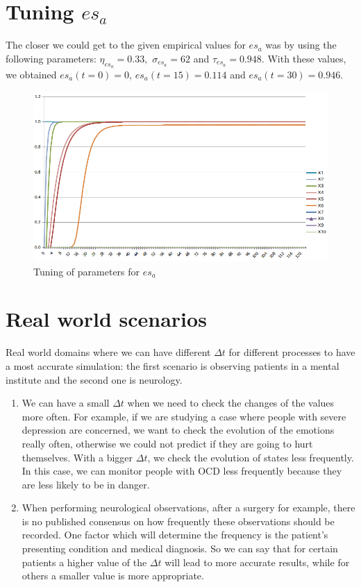 \documentclass[a4paper]{article}
\begin{document}
\section{Tuning $es_{a}$}

The closer we could get to the given empirical values for $es_{a}$ was by using the following parameters: $\eta_{es_{a}} = 0.33,$ $\sigma_{es_{a}} = 62$ and $\tau_{es_{a}} = 0.948$. With these values, we obtained $es_{a}(t = 0) = 0$, $es_{a}(t = 15) = 0.114$ and $es_{a}(t = 30) = 0.946$.

\begin{figure}[!htpb]
\center
\includegraphics[width=\textwidth]{res/img/tuning}
\caption{Tuning of parameters for $es_{a}$}
\label{fig:tuning}
\end{figure}

\section{Real world scenarios}

Real world domains where we can have different $\Delta t$ for different processes to have a most accurate simulation: the first scenario is observing patients in a mental institute and the second one is neurology.

\begin{enumerate}
\item We can have a small $\Delta t$ when we need to check the changes of the values more often. For example, if we are studying a case where people with severe depression are concerned, we want to check the evolution of the emotions really often, otherwise we could not predict if they are going to hurt themselves. With a bigger $\Delta t$, we check the evolution of states less frequently. In this case, we can monitor people with OCD less frequently because they are less likely to be in danger.
\item When performing neurological observations, after a surgery for example, there is no published consensus on how frequently these observations should be recorded. One factor which will determine the frequency is the patient’s presenting condition and medical diagnosis. So we can say that for certain patients a higher value of the $\Delta t$ will lead to more accurate results, while for others a smaller value is more appropriate.
\end{enumerate}
\end{document}

